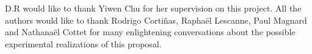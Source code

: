 \documentclass[%
 reprint,
 superscriptaddress,
 amsmath,
 amssymb,
 aps,
 pra,
 10pt
]{revtex4-2}
\newcommand{\adag}{\hat{a}^\dagger}
\newcommand{\hata}{\hat{a}}
\begin{document}
\begin{acknowledgments}
D.R would like to thank Yiwen Chu for her supervision on this project. All the authors would like to thank Rodrigo Cortiñas, Raphaël Lescanne, Paul Magnard and Nathanaël Cottet for many enlightening conversations about the possible experimental realizations of this proposal. 
\end{acknowledgments}

\end{document}
